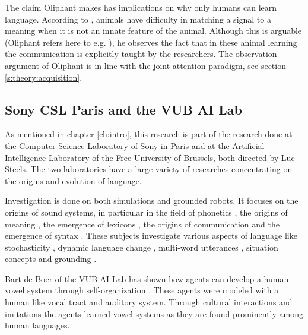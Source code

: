 The claim Oliphant makes has implications on why only humans can learn language. According to , animals have difficulty in matching a signal to a meaning when it is not an innate feature of the animal. Although this is arguable (Oliphant refers here to e.g. \cite{gardners:1969,premack:1971}), he observes the fact that in these animal learning the communication is explicitly taught by the researchers. The observation argument of Oliphant is in line with the joint attention paradigm, see section \ref{s:theory:acquisition}.


\subsection{Sony CSL Paris and the VUB AI Lab}\label{s:theory:th}


As mentioned in chapter \ref{ch:intro}, this research is part of the research done at the Computer Science Laboratory of Sony in Paris and at the Artificial Intelligence Laboratory of the Free University of Brussels, both directed by Luc Steels. The two laboratories have a large variety of researches concentrating on the origins and evolution of language. 

Investigation is done on both simulations and grounded robots. It focuses on the origins of sound systems, in particular in the field of phonetics \cite{deboer:1997,deboer:1999,oudeyer:1999}, the origins of meaning \cite{steels:1996b,steelsvogt:1997,dejongvogt:1998,vogt:1998a,dejong:1999}, the emergence of lexicons \cite{steels:1996a,steelskaplan:1998,kaplan:2000,vogt:1998b,vanlooveren:1999}, the origins of communication \cite{dejong:1999c,dejong:2000} and the emergence of syntax \cite{steels:2000a}. These subjects investigate various aspects of language like stochasticity \cite{steelskaplan:1998,kaplan:2000}, dynamic language change \cite{steels:1997c,steelsmcintyre:1999,deboervogt:1999}, multi-word utterances \cite{vanlooveren:1999}, situation concepts \cite{dejong:99b} and grounding \cite{belpaeme:1998,steelsvogt:1997,steels:2000,kaplan:2000}.

\p
Bart de Boer of the VUB AI Lab has shown how agents can develop a human vowel system through self-organization \cite{deboer:1997,deboer:1999}. These agents were modeled with a human like vocal tract and auditory system. Through cultural interactions and imitations the agents learned vowel systems as they are found prominently among human languages. 

